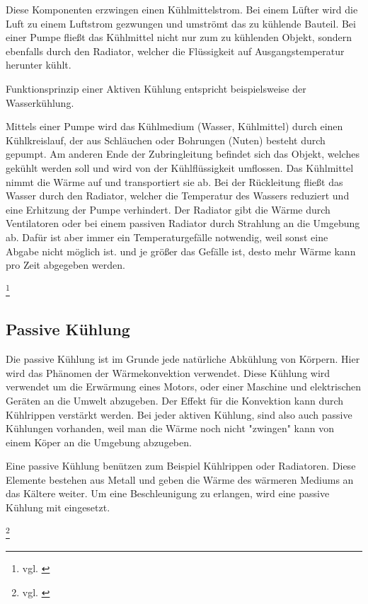 Diese Komponenten erzwingen einen Kühlmittelstrom. 
Bei einem Lüfter wird die Luft zu einem Luftstrom gezwungen und umströmt das zu kühlende Bauteil. Bei einer Pumpe fließt das Kühlmittel nicht nur zum zu kühlenden Objekt, sondern ebenfalls durch den Radiator, welcher die Flüssigkeit auf Ausgangstemperatur herunter kühlt.



Funktionsprinzip einer Aktiven Kühlung entspricht beispielsweise der Wasserkühlung.

Mittels einer Pumpe wird das Kühlmedium (Wasser, Kühlmittel) durch einen Kühlkreislauf, der aus Schläuchen oder Bohrungen (Nuten) besteht durch gepumpt. Am anderen Ende der Zubringleitung befindet sich das Objekt, welches gekühlt werden soll und wird von der Kühlflüssigkeit umflossen. 
Das Kühlmittel nimmt die Wärme auf und transportiert sie ab. Bei der Rückleitung fließt das Wasser durch den Radiator, welcher die Temperatur des Wassers reduziert und eine Erhitzung der Pumpe verhindert. 
Der Radiator gibt die Wärme durch Ventilatoren oder bei einem passiven Radiator durch Strahlung an die Umgebung ab. Dafür ist aber immer ein Temperaturgefälle notwendig, weil sonst eine Abgabe nicht möglich ist. und je größer das Gefälle ist, desto mehr Wärme kann pro Zeit abgegeben werden.


\footnote{vgl. \cite{AktiveKuehlung}}

\subsection{Passive Kühlung} 

Die passive Kühlung ist im Grunde jede natürliche Abkühlung von Körpern. Hier wird das Phänomen der Wärmekonvektion verwendet. Diese Kühlung wird verwendet um die Erwärmung eines Motors, oder einer Maschine und elektrischen Geräten an die Umwelt abzugeben. Der Effekt für die Konvektion kann durch Kühlrippen verstärkt werden. Bei jeder aktiven Kühlung, sind also auch passive Kühlungen vorhanden, weil man die Wärme noch nicht "zwingen" kann von einem Köper an die Umgebung abzugeben. 

Eine passive Kühlung benützen zum Beispiel Kühlrippen oder Radiatoren. Diese Elemente bestehen aus Metall und geben die Wärme des wärmeren Mediums an das Kältere weiter. Um eine Beschleunigung zu erlangen, wird eine passive Kühlung mit eingesetzt.

\footnote{vgl. \cite{PassiveKuehlung}}


